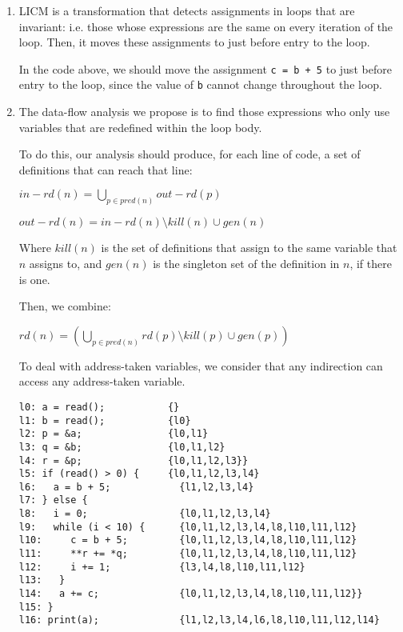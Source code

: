 


\begin{enumerate}[label=(\alph*)]

  \item
    LICM is a transformation that detects assignments in loops that are invariant: i.e. those whose expressions are the same on every iteration of the loop. Then, it moves these assignments to just before entry to the loop.

    In the code above, we should move the assignment \texttt{c = b + 5} to just before entry to the loop, since the value of \texttt{b} cannot change throughout the loop.

    \item
      The data-flow analysis we propose is to find those expressions who only use variables that are redefined within the loop body.

      To do this, our analysis should produce, for each line of code, a set of definitions that can reach that line:

      $in-rd(n) = \bigcup_{p \in pred(n)} out-rd(p)$

      $out-rd(n) = in-rd(n) \setminus kill(n) \cup gen(n)$

      Where $kill(n)$ is the set of definitions that assign to the same variable that $n$ assigns to, and $gen(n)$ is the singleton set of the definition in $n$, if there is one.

      Then, we combine:

      $rd(n) = (\bigcup_{p \in pred(n)} rd(p) \setminus kill(p) \cup gen(p))$

      To deal with address-taken variables, we consider that any indirection can access any address-taken variable.

\begin{verbatim}
l0: a = read();           {}
l1: b = read();           {l0}
l2: p = &a;               {l0,l1}
l3: q = &b;               {l0,l1,l2}
l4: r = &p;               {l0,l1,l2,l3}}
l5: if (read() > 0) {     {l0,l1,l2,l3,l4}
l6:   a = b + 5;            {l1,l2,l3,l4}
l7: } else {
l8:   i = 0;                {l0,l1,l2,l3,l4}
l9:   while (i < 10) {      {l0,l1,l2,l3,l4,l8,l10,l11,l12}
l10:     c = b + 5;         {l0,l1,l2,l3,l4,l8,l10,l11,l12}
l11:     **r += *q;         {l0,l1,l2,l3,l4,l8,l10,l11,l12}
l12:     i += 1;            {l3,l4,l8,l10,l11,l12}
l13:   }
l14:   a += c;              {l0,l1,l2,l3,l4,l8,l10,l11,l12}}
l15: }
l16: print(a);              {l1,l2,l3,l4,l6,l8,l10,l11,l12,l14}


\end{verbatim}
\end{enumerate}
